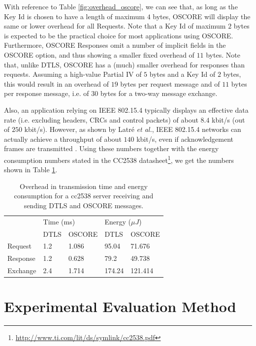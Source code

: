 {With reference to Table \ref{fig:overhead_oscore}, we can see that, as long as the Key Id is chosen to have a length of maximum $4$ bytes, OSCORE will display the same or lower overhead for all Requests. Note that a Key Id of maximum $2$ bytes is expected to be the practical choice for most applications using OSCORE. Furthermore, OSCORE Responses omit a number of implicit fields in the OSCORE option, and thus showing a smaller fixed overhead of $11$ bytes. Note that, unlike DTLS, OSCORE has a (much) smaller overhead for responses than requests. Assuming a high-value Partial IV of $5$ bytes and a Key Id of $2$ bytes, this would result in an overhead of $19$ bytes per request message and of $11$ bytes per response message, i.e. of $30$ bytes for a two-way message exchange.

Also, an application relying on IEEE 802.15.4 typically displays an effective data rate (i.e. excluding headers, CRCs and control packets) of about $8.4$ kbit/s (out of $250$ kbit/s). However, as shown by Latr\'{e} \emph{et al.}, IEEE 802.15.4 networks can actually achieve a throughput of about $140$ kbit/s, even if acknowledgement frames are transmitted \cite{latre:2005}. Using these numbers together with the energy consumption numbers stated in the CC2538 datasheet\footnote{\url{http://www.ti.com/lit/ds/symlink/cc2538.pdf}}, we get the numbers shown in Table \ref{tab:overhead}.
\begin{table}[h]
\center

\begin{tabular}{l|ll|ll}
         & \multicolumn{2}{l}{Time (ms)} & \multicolumn{2}{l}{Energy ($\mu J$)} \\ 
         & DTLS         & OSCORE         & DTLS                   & OSCORE                  \\ \hline
Request  & 1.2          & 1.086          & 95.04                  & 71.676                  \\
Response & 1.2          & 0.628          & 79.2                   & 49.738                  \\
Exchange & 2.4          & 1.714          & 174.24                 & 121.414                

\end{tabular}
\caption{Overhead in transmission time and energy consumption for a cc2538 server receiving and sending DTLS and OSCORE messages.}
\label{tab:overhead}
\end{table}

\section{Experimental Evaluation Method}
\label{sec:measure}

}
